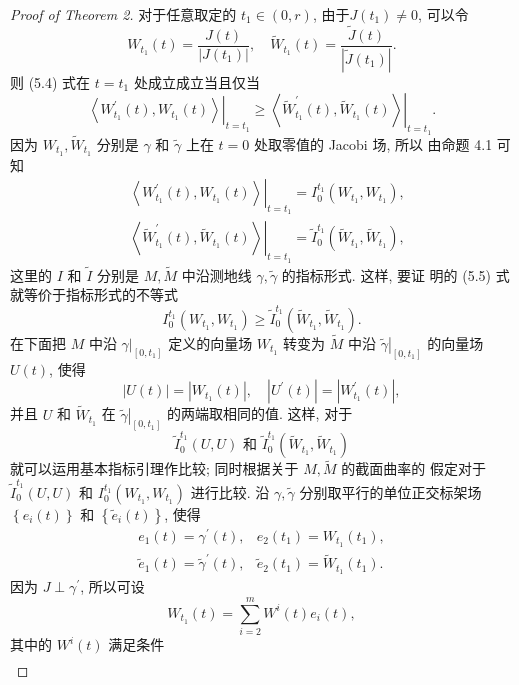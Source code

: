 \documentclass{ctexart}
\begin{document}
\begin{proof}[Proof of Theorem 2]
  
  对于任意取定的 $t_1 \in(0, r)$, 由于$J\left(t_1\right) \neq 0$, 可以令
  $$
  W_{t_1}(t)=\frac{J(t)}{\left|J\left(t_1\right)\right|}, \quad \tilde{W}_{t_1}(t)=\frac{\tilde{J}(t)}{\left|\tilde{J}\left(t_1\right)\right|} .
  $$
  则 (5.4) 式在 $t=t_1$ 处成立成立当且仅当
  $$
  \left.\left\langle W_{t_1}^{\prime}(t), W_{t_1}(t)\right\rangle\right|_{t=t_1} \geq\left.\left\langle\tilde{W}_{t_1}^{\prime}(t), \tilde{W}_{t_1}(t)\right\rangle\right|_{t=t_1} .
  $$
  因为 $W_{t_1}, \tilde{W}_{t_1}$ 分别是 $\gamma$ 和 $\tilde{\gamma}$ 上在 $t=0$ 处取零值的 Jacobi 场, 所以 由命题 4.1 可知
  $$
  \begin{aligned}
  & \left.\left\langle W_{t_1}^{\prime}(t), W_{t_1}(t)\right\rangle\right|_{t=t_1}=I_0^{t_1}\left(W_{t_1}, W_{t_1}\right), \\
  & \left.\left\langle\tilde{W}_{t_1}^{\prime}(t), \tilde{W}_{t_1}(t)\right\rangle\right|_{t=t_1}=\tilde{I}_0^{t_1}\left(\tilde{W}_{t_1}, \tilde{W}_{t_1}\right),
  \end{aligned}
  $$
  这里的 $I$ 和 $\tilde{I}$ 分别是 $M, \tilde{M}$ 中沿测地线 $\gamma, \tilde{\gamma}$ 的指标形式. 这样, 要证 明的 (5.5) 式就等价于指标形式的不等式
  $$
  I_0^{t_1}\left(W_{t_1}, W_{t_1}\right) \geq \tilde{I}_0^{t_1}\left(\tilde{W}_{t_1}, \tilde{W}_{t_1}\right) .
  $$
  在下面把 $M$ 中沿 $\left.\gamma\right|_{\left[0, t_1\right]}$ 定义的向量场 $W_{t_1}$ 转变为 $\tilde{M}$ 中沿 $\left.\tilde{\gamma}\right|_{\left[0, t_1\right]}$ 的向量场 $U(t)$, 使得
  $$
  |U(t)|=\left|W_{t_1}(t)\right|, \quad\left|U^{\prime}(t)\right|=\left|W_{t_1}^{\prime}(t)\right|,
  $$
  并且 $U$ 和 $\tilde{W}_{t_1}$ 在 $\left.\tilde{\gamma}\right|_{\left[0, t_1\right]}$ 的两端取相同的值. 这样, 对于
  $$
  \tilde{I}_0^{t_1}(U, U) \text { 和 } \tilde{I}_0^{t_1}\left(\tilde{W}_{t_1}, \tilde{W}_{t_1}\right)
  $$
  就可以运用基本指标引理作比较; 同时根据关于 $M, \tilde{M}$ 的截面曲率的 假定对于 $\tilde{I}_0^{t_1}(U, U)$ 和 $I_0^{t_1}\left(W_{t_1}, W_{t_1}\right)$ 进行比较.
  沿 $\gamma, \tilde{\gamma}$ 分别取平行的单位正交标架场 $\left\{e_i(t)\right\}$ 和 $\left\{\tilde{e}_i(t)\right\}$, 使得
  $$
  \begin{array}{ll}
  e_1(t)=\gamma^{\prime}(t), & e_2\left(t_1\right)=W_{t_1}\left(t_1\right), \\
  \tilde{e}_1(t)=\tilde{\gamma}^{\prime}(t), & \tilde{e}_2\left(t_1\right)=\tilde{W}_{t_1}\left(t_1\right) .
  \end{array}
  $$
  因为 $J \perp \gamma^{\prime}$, 所以可设
  $$
  W_{t_1}(t)=\sum_{i=2}^m W^i(t) e_i(t),
  $$
  其中的 $W^i(t)$ 满足条件
  $$
  \begin{aligned}

\end{aligned}$$
\end{proof}
\end{document}

